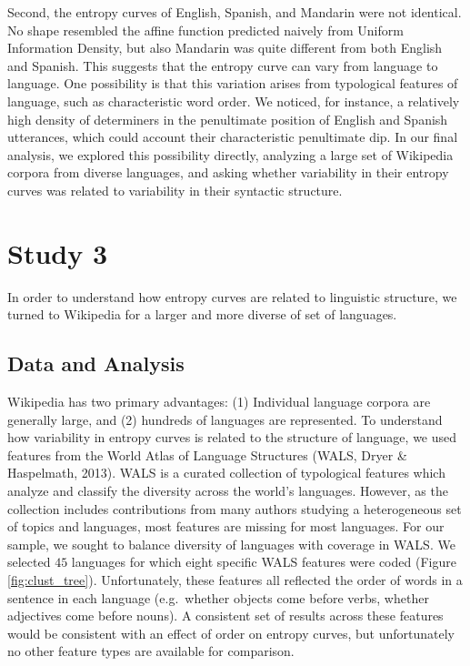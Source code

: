 \documentclass[10pt, letterpaper]{article}
\begin{document}
Second, the entropy curves of English, Spanish, and Mandarin were not
identical. No shape resembled the affine function predicted naively from
Uniform Information Density, but also Mandarin was quite different from
both English and Spanish. This suggests that the entropy curve can vary
from language to language. One possibility is that this variation arises
from typological features of language, such as characteristic word
order. We noticed, for instance, a relatively high density of
determiners in the penultimate position of English and Spanish
utterances, which could account their characteristic penultimate dip. In
our final analysis, we explored this possibility directly, analyzing a
large set of Wikipedia corpora from diverse languages, and asking
whether variability in their entropy curves was related to variability
in their syntactic structure.

\section{Study 3}\label{study-3}

In order to understand how entropy curves are related to linguistic
structure, we turned to Wikipedia for a larger and more diverse of set
of languages.

\subsection{Data and Analysis}\label{data-and-analysis-2}

Wikipedia has two primary advantages: (1) Individual language corpora
are generally large, and (2) hundreds of languages are represented. To
understand how variability in entropy curves is related to the structure
of language, we used features from the World Atlas of Language
Structures (WALS, Dryer \& Haspelmath, 2013). WALS is a curated
collection of typological features which analyze and classify the
diversity across the world's languages. However, as the collection
includes contributions from many authors studying a heterogeneous set of
topics and languages, most features are missing for most languages. For
our sample, we sought to balance diversity of languages with coverage in
WALS. We selected \(45\) languages for which eight specific WALS
features were coded (Figure \ref{fig:clust_tree}). Unfortunately, these
features all reflected the order of words in a sentence in each language
(e.g.~whether objects come before verbs, whether adjectives come before
nouns). A consistent set of results across these features would be
consistent with an effect of order on entropy curves, but unfortunately
no other feature types are available for comparison.
\end{document}
